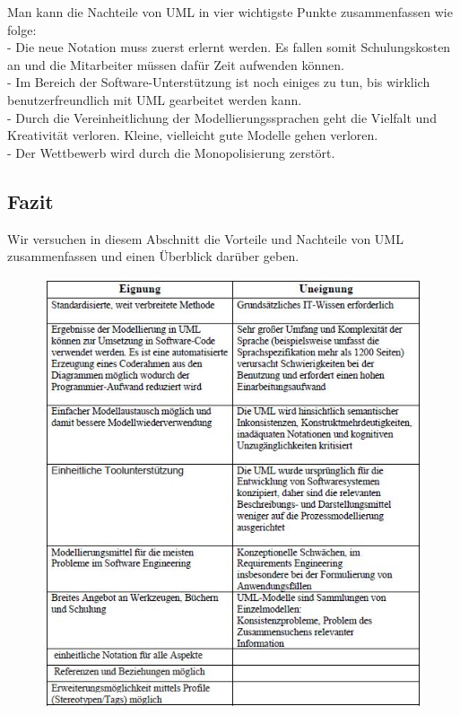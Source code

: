Man kann die Nachteile von UML in vier wichtigste Punkte zusammenfassen wie folge:\\
- Die neue Notation muss zuerst erlernt werden. Es fallen somit Schulungskosten an
und die Mitarbeiter müssen dafür Zeit aufwenden können.\\
- Im Bereich der Software-Unterstützung ist noch einiges zu tun, bis wirklich
benutzerfreundlich mit UML gearbeitet werden kann.\\
- Durch die Vereinheitlichung der Modellierungssprachen geht die Vielfalt und
Kreativität verloren. Kleine, vielleicht gute Modelle gehen verloren.\\
- Der Wettbewerb wird durch die Monopolisierung zerstört.
\subsection{Fazit}

Wir versuchen in diesem Abschnitt die Vorteile und Nachteile von UML zusammenfassen und einen Überblick darüber geben.

\begin{center}
\begin{figure}[h]
   
\includegraphics[scale=1]{Graphics/vornachteil.jpg} 



\label{fig11}


\end{figure}
\end{center}
\newpage






